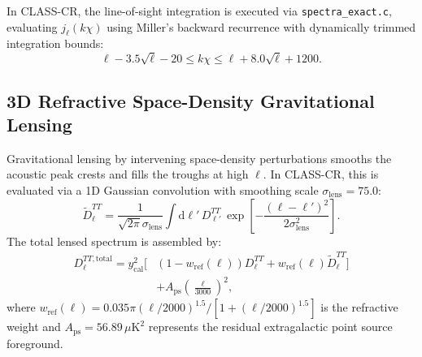 \documentclass[aps,prd,reprint,superscriptaddress,nofootinbib,twocolumn]{revtex4-2}
\begin{document}
In CLASS-CR, the line-of-sight integration is executed via \texttt{spectra\_exact.c}, evaluating $j_\ell(k\chi)$ using Miller's backward recurrence with dynamically trimmed integration bounds:
\begin{equation}
\label{eq:bessel_bounds}
\ell - 3.5\sqrt{\ell} - 20 \le k\chi \le \ell + 8.0\sqrt{\ell} + 1200.
\end{equation}

\subsection{3D Refractive Space-Density Gravitational Lensing}

Gravitational lensing by intervening space-density perturbations smooths the acoustic peak crests and fills the troughs at high $\ell$. In CLASS-CR, this is evaluated via a 1D Gaussian convolution with smoothing scale $\sigma_{\text{lens}} = 75.0$:
\begin{equation}
\label{eq:lensing_smooth}
\widetilde{D}_\ell^{TT} = \frac{1}{\sqrt{2\pi}\sigma_{\text{lens}}} \int \mathrm{d}\ell'\,D_{\ell'}^{TT}\,\exp\left[ -\frac{(\ell - \ell')^2}{2\sigma_{\text{lens}}^2} \right].
\end{equation}
The total lensed spectrum is assembled by:
\begin{equation}
\label{eq:total_lensed}
\begin{aligned}
D_\ell^{TT,\text{total}} = y_{\text{cal}}^2 \Big[ &(1 - w_{\text{ref}}(\ell)) D_\ell^{TT} + w_{\text{ref}}(\ell) \widetilde{D}_\ell^{TT} \Big] \\
&+ A_{\text{ps}} \left(\frac{\ell}{3000}\right)^2,
\end{aligned}
\end{equation}
where $w_{\text{ref}}(\ell) = 0.035\pi (\ell/2000)^{1.5} / [1 + (\ell/2000)^{1.5}]$ is the refractive weight and $A_{\text{ps}} = 56.89\,\mu\text{K}^2$ represents the residual extragalactic point source foreground.
\end{document}
